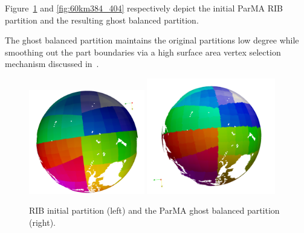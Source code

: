 \documentclass[a4paper]{article}
\begin{document}
Figure~\ref{fig:60km0_255} and \ref{fig:60km384_404} respectively depict the
initial ParMA RIB partition and the resulting ghost balanced partition.

The ghost balanced partition maintains the original partitions low degree while
smoothing out the part boundaries via a high surface area vertex selection
mechanism discussed in~\cite{ParMA-2016}.

\begin{figure}
\centering
\includegraphics[width=0.45\textwidth]{60km/init/0_255.png}
\includegraphics[width=0.5\textwidth]{60km/final/0_255.png}
\caption{\label{fig:60km0_255} RIB initial partition (left) and the ParMA ghost balanced partition (right).}


\end{figure}
\end{document}
